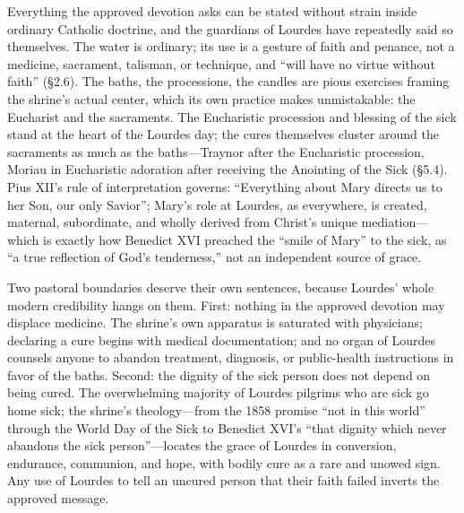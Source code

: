 Everything the approved devotion asks can be stated without
strain inside ordinary Catholic doctrine, and the guardians of
Lourdes have repeatedly said so themselves. The water is
ordinary; its use is a gesture of faith and penance, not a
medicine, sacrament, talisman, or technique, and ``will have no
virtue without faith'' (\S2.6). The
baths, the processions, the candles are pious exercises framing
the shrine's actual center, which its own practice makes
unmistakable: the Eucharist and the sacraments. The Eucharistic
procession and blessing of the sick stand at the heart of the
Lourdes day; the cures themselves cluster around the sacraments
as much as the baths---Traynor after the Eucharistic procession,
Moriau in Eucharistic adoration after receiving the Anointing of
the Sick (\S5.4). Pius XII's rule of interpretation governs:
``Everything about Mary directs us to her Son, our only
Savior''; Mary's role at Lourdes, as everywhere, is created,
maternal, subordinate, and wholly derived from Christ's unique
mediation---which is exactly how Benedict XVI preached the
``smile of Mary'' to the sick, as ``a true reflection of God's
tenderness,'' not an independent source of
grace.

Two pastoral boundaries deserve their own sentences, because
Lourdes' whole modern credibility hangs on them. First: nothing
in the approved devotion may displace medicine. The shrine's own
apparatus is saturated with physicians; declaring a cure begins
with medical documentation; and no organ of Lourdes counsels
anyone to abandon treatment, diagnosis, or public-health
instructions in favor of the baths. Second: the dignity of the
sick person does not depend on being cured. The overwhelming
majority of Lourdes pilgrims who are sick go home sick; the
shrine's theology---from the 1858 promise ``not in this world''
through the World Day of the Sick to Benedict XVI's ``that
dignity which never abandons the sick person''---locates the
grace of Lourdes in conversion, endurance, communion, and hope,
with bodily cure as a rare and unowed sign. Any use of Lourdes
to tell an uncured person that their faith failed inverts the
approved message.

